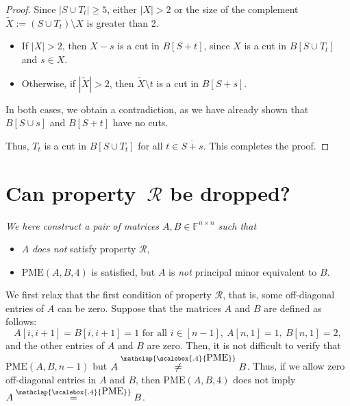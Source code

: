 \documentclass[11pt,letterpaper]{article}
\newcommand{\comp}[1]{\overline{#1}}
\newcommand{\F}{\mathbb{F}}
\newcommand{\PME}{\stackrel{\mathclap{\scalebox{.4}{\mbox{PME}}}}{=}}
\newcommand{\nPME}{\stackrel{\mathclap{\scalebox{.4}{\mbox{PME}}}}{\neq}}
\newcommand{\kPME}[3]{\mathrm{PME}(#1, #2, #3)}
\newcommand{\prop}{\mathcal{R}}
\begin{document}
{{{\begin{proof}
Since $|S \cup T_t| \geq 5$, either $|X| > 2$ or the size of the complement $\widetilde{X} := (S \cup T_t) \setminus X$ is greater than 2.
\begin{itemize}
\item If $|X| > 2$, then $X - {s}$ is a cut in $B[S + {t}]$, since $X$ is a cut in $B[S \cup T_t]$ and $s \in X$.

\item Otherwise, if $|\widetilde{X}| > 2$, then $\widetilde{X} \setminus {t}$ is a cut in $B[S + {s}]$.
\end{itemize}
In both cases, we obtain a contradiction, as we have already shown that $B[S \cup {s}]$ and $B[S + {t}]$ have no cuts.

Thus, $T_t$ is a cut in $B[S \cup T_t]$ for all $t \in \comp{S+s}$. This completes the proof.
\end{proof}


\section{Can property~$\prop$ be dropped?}
\label{appendix:necessity-of-Q}
{\em We here construct a pair of matrices $A,B\in\F^{n\times n}$ such that 
\begin{itemize}
\item $A$ \emph{does not} satisfy property $\prop$, 
\item $\kPME{A}{B}{4}$ is satisfied, but $A$ is \emph{not} principal minor equivalent to $B$.
\end{itemize}


We first  relax that the first condition of property $\prop$, that is, some off-diagonal entries of $A$ can be zero. Suppose that the matrices $A$ and $B$ are defined as follows: $$A[i, i+1]=B[i, i+1]=1 \text{ for all } i\in[n-1],\ A[n,1]=1,\ B[n,1]=2, $$ and the other entries of $A$ and $B$ are zero. Then, it is not difficult to verify that $\kPME{A}{B}{n-1}$ but $A\nPME B$. Thus, if we allow zero off-diagonal entries in $A$ and $B$, then $\kPME{A}{B}{4}$ does not imply $A\PME B$.   

}}}}
\end{document}

